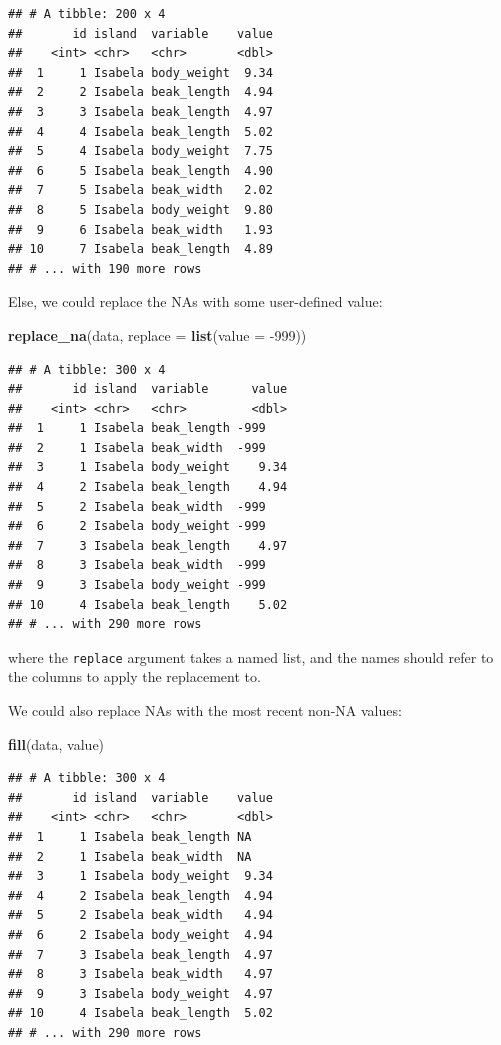 \documentclass[]{book}
\newenvironment{Shaded}{}{}
\newcommand{\DataTypeTok}[1]{\textcolor[rgb]{0.56,0.13,0.00}{#1}}
\newcommand{\DecValTok}[1]{\textcolor[rgb]{0.25,0.63,0.44}{#1}}
\newcommand{\KeywordTok}[1]{\textcolor[rgb]{0.00,0.44,0.13}{\textbf{#1}}}
\newcommand{\NormalTok}[1]{#1}
\begin{document}
\begin{verbatim}
## # A tibble: 200 x 4
##       id island  variable    value
##    <int> <chr>   <chr>       <dbl>
##  1     1 Isabela body_weight  9.34
##  2     2 Isabela beak_length  4.94
##  3     3 Isabela beak_length  4.97
##  4     4 Isabela beak_length  5.02
##  5     4 Isabela body_weight  7.75
##  6     5 Isabela beak_length  4.90
##  7     5 Isabela beak_width   2.02
##  8     5 Isabela body_weight  9.80
##  9     6 Isabela beak_width   1.93
## 10     7 Isabela beak_length  4.89
## # ... with 190 more rows
\end{verbatim}

Else, we could replace the NAs with some user-defined value:

\begin{Shaded}
\begin{Highlighting}[]
\KeywordTok{replace_na}\NormalTok{(data, }\DataTypeTok{replace =} \KeywordTok{list}\NormalTok{(}\DataTypeTok{value =} \DecValTok{-999}\NormalTok{))}
\end{Highlighting}
\end{Shaded}

\begin{verbatim}
## # A tibble: 300 x 4
##       id island  variable      value
##    <int> <chr>   <chr>         <dbl>
##  1     1 Isabela beak_length -999   
##  2     1 Isabela beak_width  -999   
##  3     1 Isabela body_weight    9.34
##  4     2 Isabela beak_length    4.94
##  5     2 Isabela beak_width  -999   
##  6     2 Isabela body_weight -999   
##  7     3 Isabela beak_length    4.97
##  8     3 Isabela beak_width  -999   
##  9     3 Isabela body_weight -999   
## 10     4 Isabela beak_length    5.02
## # ... with 290 more rows
\end{verbatim}

where the \texttt{replace} argument takes a named list, and the names should refer to the columns to apply the replacement to.

We could also replace NAs with the most recent non-NA values:

\begin{Shaded}
\begin{Highlighting}[]
\KeywordTok{fill}\NormalTok{(data, value)}
\end{Highlighting}
\end{Shaded}

\begin{verbatim}
## # A tibble: 300 x 4
##       id island  variable    value
##    <int> <chr>   <chr>       <dbl>
##  1     1 Isabela beak_length NA   
##  2     1 Isabela beak_width  NA   
##  3     1 Isabela body_weight  9.34
##  4     2 Isabela beak_length  4.94
##  5     2 Isabela beak_width   4.94
##  6     2 Isabela body_weight  4.94
##  7     3 Isabela beak_length  4.97
##  8     3 Isabela beak_width   4.97
##  9     3 Isabela body_weight  4.97
## 10     4 Isabela beak_length  5.02
## # ... with 290 more rows
\end{verbatim}
\end{document}
